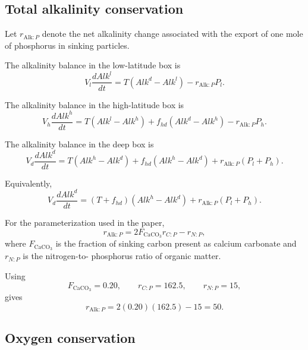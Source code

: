 \documentclass[11pt]{article}
\begin{document}
\subsection{Total alkalinity conservation}

Let \(r_{\mathrm{Alk}:P}\) denote the net alkalinity change
associated with the export of one mole of phosphorus in
sinking particles.

The alkalinity balance in the low-latitude box is
\begin{equation}
V_l\frac{dAlk^l}{dt}
=
T\left(Alk^d-Alk^l\right)
-
r_{\mathrm{Alk}:P}P_l.
\label{eq:alk_l}
\end{equation}

The alkalinity balance in the high-latitude box is
\begin{equation}
V_h\frac{dAlk^h}{dt}
=
T\left(Alk^l-Alk^h\right)
+
f_{hd}\left(Alk^d-Alk^h\right)
-
r_{\mathrm{Alk}:P}P_h.
\label{eq:alk_h}
\end{equation}

The alkalinity balance in the deep box is
\begin{equation}
V_d\frac{dAlk^d}{dt}
=
T\left(Alk^h-Alk^d\right)
+
f_{hd}\left(Alk^h-Alk^d\right)
+
r_{\mathrm{Alk}:P}\left(P_l+P_h\right).
\label{eq:alk_d}
\end{equation}

Equivalently,
\begin{equation}
V_d\frac{dAlk^d}{dt}
=
\left(T+f_{hd}\right)
\left(Alk^h-Alk^d\right)
+
r_{\mathrm{Alk}:P}\left(P_l+P_h\right).
\end{equation}

For the parameterization used in the paper,
\begin{equation}
r_{\mathrm{Alk}:P}
=
2F_{\mathrm{CaCO_3}}r_{C:P}
-
r_{N:P},
\label{eq:alk_ratio}
\end{equation}
where \(F_{\mathrm{CaCO_3}}\) is the fraction of sinking carbon
present as calcium carbonate and \(r_{N:P}\) is the nitrogen-to-
phosphorus ratio of organic matter.

Using
\[
F_{\mathrm{CaCO_3}}=0.20,
\qquad
r_{C:P}=162.5,
\qquad
r_{N:P}=15,
\]
gives
\begin{equation}
r_{\mathrm{Alk}:P}
=
2(0.20)(162.5)-15
=
50.
\end{equation}

\subsection{Oxygen conservation}
\end{document}
